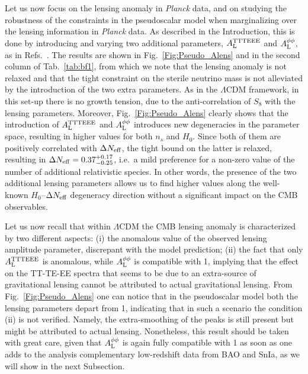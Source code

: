 \documentclass[a4paper,11pt]{article}
\begin{document}
Let us now focus on the lensing anomaly in \emph{Planck} data, and on studying the robustness of the constraints in the pseudoscalar model when marginalizing over the lensing information in \textit{Planck} data.
As described in the Introduction, this is done by introducing {and varying} two additional parameters, $A^{\rm TTTEEE}_{\rm L}$ and $A^{\phi\phi}_{\rm L}$, as in Refs.~\cite{Simard:2017xtw,Wu:2019hek,Murgia:2020ryi,Abellan:2021bpx}.
The results are shown in Fig.~\ref{Fig:Pseudo_Alens} and in the second column of Tab.~\ref{tab:bf1}, from which we note that the lensing anomaly is not relaxed and that the tight constraint on the sterile neutrino mass is not alleviated by the introduction of the two extra parameters. As in the $\Lambda$CDM framework, in this set-up there is no growth tension, due to the anti-correlation of $S_8$ with the lensing parameters.
Moreover, Fig.~\ref{Fig:Pseudo_Alens} clearly shows that the introduction of $A_{\rm{L}}^{\rm{TTTEEE}}$ and $A_{\rm{L}}^{\rm{\phi\phi}}$ introduces new degeneracies in the parameter space, resulting in higher values for both $n_s$ and $H_0$. Since both of them are positively correlated with $\Delta N_{\rm eff}$, the tight bound on the latter is relaxed, resulting in $\Delta N_{\rm{eff}}=0.37^{+0.17}_{-0.25}$, i.e.~a mild preference for a non-zero value of the number of additional relativistic species. In other words, the presence of the two additional lensing parameters allows us to find higher values along the well-known $H_0$--$\Delta N_{\rm eff}$ degeneracy direction without a significant impact on the CMB observables.

{Let us now recall that within $\Lambda$CDM the CMB lensing anomaly is characterized by two different aspects: (i) the anomalous value of the observed lensing amplitude parameter, discrepant with the model prediction; (ii) the fact that only $A_{\rm{L}}^{\rm{TTTEEE}}$ is anomalous, while $A_{\rm{L}}^{\phi\phi}$ is compatible with 1, implying that the effect on the TT-TE-EE spectra that seems to be due to an extra-source of gravitational lensing cannot be attributed to actual gravitational lensing. From Fig.~\ref{Fig:Pseudo_Alens} one can notice that in the pseudoscalar model both the lensing parameters depart from 1, indicating that in such a scenario the condition (ii) is not verified. Namely, the extra-smoothing of the peaks is still present but might be attributed to actual lensing. 
Nonetheless, this result should be taken with great care, given that $A_{\rm{L}}^{\phi\phi}$ is again fully compatible with 1 as soon as one adds to the analysis complementary low-redshift data from BAO and SnIa, as we will show in the next Subsection.}
\end{document}
